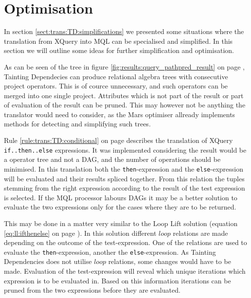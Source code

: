 \section{Optimisation}
\label{sect:disc:optimisations}

In section \ref{sect:trans:TD:simplifications} we presented some situations where the translation from XQuery into
MQL can be specialised and simplified. In this section we will outline some ideas for further simplification and
optimisation.

As can be seen of the tree in figure \ref{fig:results:query_pathpred_result} on page
\pageref{fig:results:query_pathpred_result}, Tainting Dependecies can produce relational algebra trees with
consecutive \textsf{project} operators. This is of cource unnecessary, and such operators can be merged into one
single \textsf{project}. Attributes which is not part of the result or part of evaluation of the result can be
pruned. This may however not be anything the translator would need to consider, as the Mars optimiser allready
implements methods for detecting and simplifying such trees.

Rule \ref{rule:trans:TD:conditional} on page \pageref{rule:trans:TD:conditional} describes the translation of
XQuery \texttt{if..then..else} expressions. It was implemented considering the result would be a operator tree and
not a DAG, and the number of operations should be minimised. In this translation both the \texttt{then}-expression
and the \texttt{else}-expression will be evaluated and their results spliced together. From this relation the
tuples stemming from the right expression according to the result of the test expression is selected. If the MQL
processor labours DAGs it may be a better solution to evaluate the two expressions only for the cases where they
are to be returned. 

This may be done in a matter very similar to the Loop Lift solution (equation
\ref{eq:ll:ifthenelse} on page \pageref{eq:ll:ifthenelse}). In this solution different $loop$ relations are made
depending on the outcome of the test-expression. One of the relations are used to evaluate the
\texttt{then}-expression, another the \texttt{else}-expression. As Tainting Dependencies does not utilise $loop$
relations, some changes would have to be made. Evaluation of the test-expression will reveal which unique
iterations which expression is to be evaluated in. Based on this information iterations can be pruned from the two
expressions before they are evaluated.

